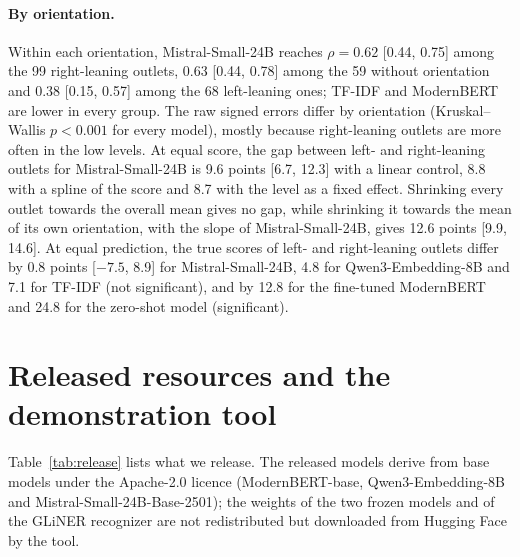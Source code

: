 \documentclass[11pt,a4paper]{article}
\begin{document}
\paragraph{By orientation.} Within each orientation, Mistral-Small-24B reaches $\rho = 0.62$ [0.44, 0.75] among the 99
right-leaning outlets, 0.63 [0.44, 0.78] among the 59 without orientation and 0.38 [0.15, 0.57] among the 68
left-leaning ones; TF-IDF and ModernBERT are lower in every group. The raw signed errors differ by orientation
(Kruskal--Wallis $p < 0.001$ for every model), mostly because right-leaning outlets are more often in the low levels. At
equal score, the gap between left- and right-leaning outlets for Mistral-Small-24B is 9.6 points [6.7, 12.3] with a
linear control, 8.8 with a spline of the score and 8.7 with the level as a fixed effect. Shrinking every outlet towards
the overall mean gives no gap, while shrinking it towards the mean of its own orientation, with the slope of
Mistral-Small-24B, gives 12.6 points [9.9, 14.6]. At equal prediction, the true scores of left- and right-leaning
outlets differ by 0.8 points [$-7.5$, 8.9] for Mistral-Small-24B, 4.8 for Qwen3-Embedding-8B and 7.1 for TF-IDF (not
significant), and by 12.8 for the fine-tuned ModernBERT and 24.8 for the zero-shot model (significant).

\section{Released resources and the demonstration tool}\label{app:tool}
Table~\ref{tab:release} lists what we release. The released models derive from base models under the Apache-2.0 licence
(ModernBERT-base, Qwen3-Embedding-8B and Mistral-Small-24B-Base-2501); the weights of the two frozen models and of the
GLiNER recognizer are not redistributed but downloaded from Hugging Face by the tool.
\end{document}
